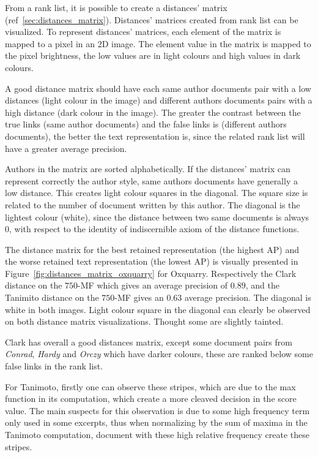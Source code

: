 From a rank list, it is possible to create a distances' matrix (ref~\ref{sec:distances_matrix}).
Distances' matrices created from rank list can be visualized.
To represent distances' matrices, each element of the matrix is mapped to a pixel in an 2D image.
The element value in the matrix is mapped to the pixel brightness, the low values are in light colours and high values in dark colours.

A good distance matrix should have each same author documents pair with a low distances (light colour in the image) and different authors documents pairs with a high distance (dark colour in the image).
The greater the contrast between the true links (same author documents) and the false links is (different authors documents), the better the text representation is, since the related rank list will have a greater average precision.

Authors in the matrix are sorted alphabetically.
If the distances' matrix can represent correctly the author style, same authors documents have generally a low distance.
This creates light colour squares in the diagonal.
The square size is related to the number of document written by this author.
The diagonal is the lightest colour (white), since the distance between two same documents is always 0, with respect to the identity of indiscernible axiom of the distance functions.

The distance matrix for the best retained representation (the highest AP) and the worse retained text representation (the lowest AP) is visually presented in Figure~\ref{fig:distances_matrix_oxquarry} for Oxquarry.
Respectively the Clark distance on the $750$-MF which gives an average precision of $0.89$, and the Tanimito distance on the $750$-MF gives an $0.63$ average precision.
The diagonal is white in both images.
Light colour square in the diagonal can clearly be observed on both distance matrix visualizations.
Thought some are slightly tainted.

Clark has overall a good distances matrix, except some document pairs from \textit{Conrad}, \textit{Hardy} and \textit{Orczy} which have darker colours, these are ranked below some false links in the rank list.

For Tanimoto, firstly one can observe these stripes, which are due to the max function in its computation, which create a more cleaved decision in the score value.
The main suspects for this observation is due to some high frequency term only used in some excerpts, thus when normalizing by the sum of maxima in the Tanimoto computation, document with these high relative frequency create these stripes.


